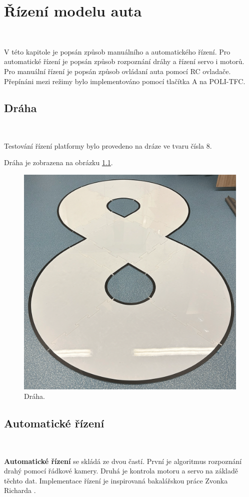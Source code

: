 \chapter{Řízení modelu auta}
\label{sec:PlatformControl}\

V této kapitole je popsán způsob manuálního a automatického řízení. Pro automatické
řízení je popsán způsob rozpoznání dráhy a řízení servo i motorů. Pro manuální
řízení je popsán způsob ovládaní auta pomocí RC ovladače. Přepínáni mezi režimy
bylo implementováno pomocí tlačítka A na POLI-TFC.

\section{Dráha}\

Testování řízení platformy bylo provedeno na dráze ve tvaru čísla 8.

Dráha je zobrazena na obrázku \ref{fig:Road}.

\begin{figure}[!h]
    \centering
    \includegraphics[width = .55\linewidth]{Figures/Road.png}
    \caption{Dráha.}
    \label{fig:Road}
    \vspace{-15pt}
\end{figure}

\section{Automatické řízení}\

\textbf{Automatické řízení} se skládá ze dvou častí. První je algoritmus rozpoznání 
drahý pomocí řádkové kamery. Druhá je kontrola motoru a servo na základě těchto dat. 
Implementace řízení je inspirovaná bakalářskou práce Zvonka Richarda  \cite{robot}.

